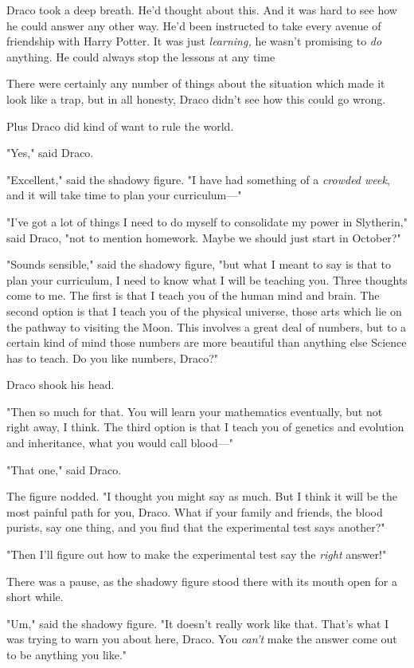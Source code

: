 Draco took a deep breath. He'd thought about this. And it was hard to see how
he could answer any other way. He'd been instructed to take every avenue of
friendship with Harry Potter. It was just \emph{learning,} he wasn't promising
to \emph{do} anything. He could always stop the lessons at any time{\el}

There were certainly any number of things about the situation which made it
look like a trap, but in all honesty, Draco didn't see how this could go wrong.

Plus Draco did kind of want to rule the world.

"Yes," said Draco.

"Excellent," said the shadowy figure. "I have had something of a \emph{crowded
week}, and it will take time to plan your curriculum—"

"I've got a lot of things I need to do myself to consolidate my power in
Slytherin," said Draco, "not to mention homework. Maybe we should just start in
October?"

"Sounds sensible," said the shadowy figure, "but what I meant to say is that to
plan your curriculum, I need to know what I will be teaching you. Three
thoughts come to me. The first is that I teach you of the human mind and brain.
The second option is that I teach you of the physical universe, those arts
which lie on the pathway to visiting the Moon. This involves a great deal of
numbers, but to a certain kind of mind those numbers are more beautiful than
anything else Science has to teach. Do you like numbers, Draco?"

Draco shook his head.

"Then so much for that. You will learn your mathematics eventually, but not
right away, I think. The third option is that I teach you of genetics and
evolution and inheritance, what you would call blood—"

"That one," said Draco.

The figure nodded. "I thought you might say as much. But I think it will be the
most painful path for you, Draco. What if your family and friends, the blood
purists, say one thing, and you find that the experimental test says another?"

"Then I'll figure out how to make the experimental test say the \emph{right}
answer!"

There was a pause, as the shadowy figure stood there with its mouth open for a
short while.

"Um," said the shadowy figure. "It doesn't really work like that. That's what I
was trying to warn you about here, Draco. You \emph{can't} make the answer come
out to be anything you like."


